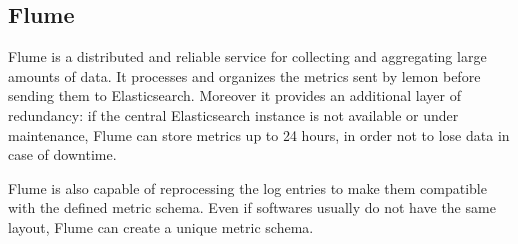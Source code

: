 \subsection{Flume}

Flume is a distributed and reliable service for collecting and aggregating
large amounts of data. It processes and organizes the metrics sent by
lemon before sending them to Elasticsearch. Moreover it provides an
additional layer of redundancy: if the central Elasticsearch instance is
not available or under maintenance, Flume can store metrics up to 24
hours, in order not to lose data in case of downtime.

Flume is also capable of reprocessing the log entries to make them
compatible with the defined metric schema. Even if softwares usually do
not have the same layout, Flume can create a unique metric schema.
